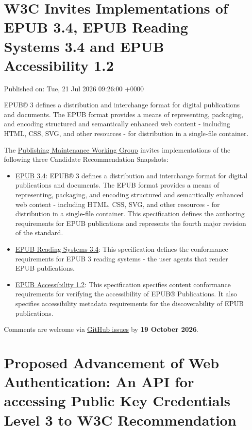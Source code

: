 \documentclass[11pt,a4paper]{article}
\begin{document}
\section{W3C Invites Implementations of EPUB 3.4, EPUB Reading Systems 3.4 and EPUB Accessibility 1.2}

Published on: Tue, 21 Jul 2026 09:26:00 +0000

EPUB® 3 defines a distribution and interchange format for digital publications and documents. The EPUB format provides a means of representing, packaging, and encoding structured and semantically enhanced web content - including HTML, CSS, SVG, and other resources - for distribution in a single-file container.

The \href{https://www.w3.org/groups/wg/pm/}{Publishing Maintenance Working Group} invites implementations of the following three Candidate Recommendation Snapshots:

\begin{itemize}
\item \href{https://www.w3.org/TR/2026/CR-epub-34-20260721/}{EPUB 3.4}: EPUB® 3 defines a distribution and interchange format for digital publications and documents. The EPUB format provides a means of representing, packaging, and encoding structured and semantically enhanced web content - including HTML, CSS, SVG, and other resources - for distribution in a single-file container. This specification defines the authoring requirements for EPUB publications and represents the fourth major revision of the standard.
\item \href{https://www.w3.org/TR/2026/CR-epub-rs-34-20260721/}{EPUB Reading Systems 3.4}: This specification defines the conformance requirements for EPUB 3 reading systems - the user agents that render EPUB publications.
\item \href{https://www.w3.org/TR/2026/CR-epub-a11y-12-20260721/}{EPUB Accessibility 1.2}: This specification specifies content conformance requirements for verifying the accessibility of EPUB® Publications. It also specifies accessibility metadata requirements for the discoverability of EPUB publications.
\end{itemize}

Comments are welcome via \href{https://github.com/w3c/epub-specs/issues/}{GitHub issues} by \textbf{19 October 2026}.

\section{Proposed Advancement of Web Authentication: An API for accessing Public Key Credentials Level 3 to W3C Recommendation}
\end{document}
